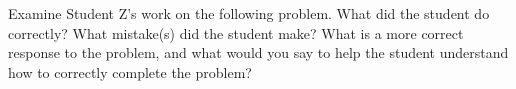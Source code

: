 \documentclass[12pt,letterpaper]{hmcpset}
\begin{document}

\begin{problem}[1]
    Examine Student Z's work on the following problem.  What did the student do correctly?  What mistake(s) did the student make?  What is a more correct response to the problem, and what would you say to help the student understand how to correctly complete the problem?

    \begin{center}
    \end{center}
\end{problem}

\begin{solution}
    \vfill
\end{solution}
\newpage
\end{document}
